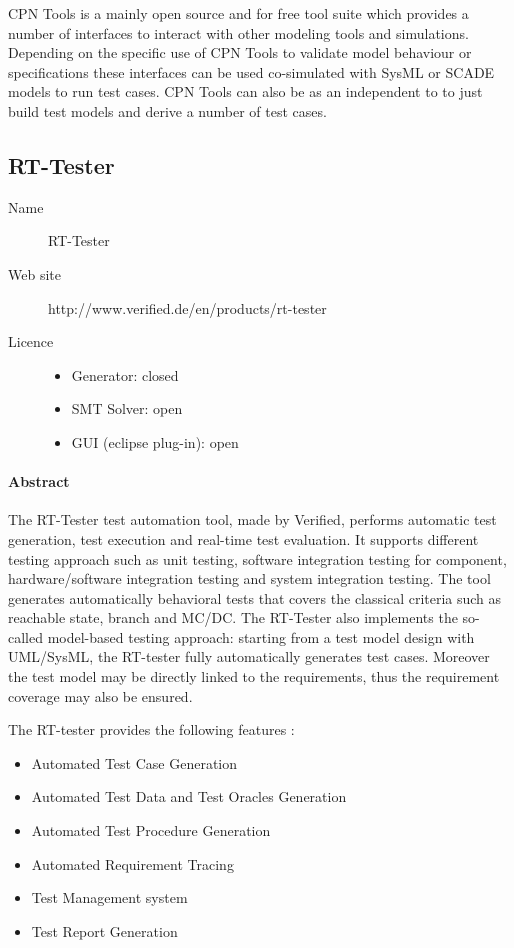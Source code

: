 CPN Tools is a mainly open source and for free tool suite which provides a number of interfaces to interact with other modeling tools and simulations. Depending on the specific use of CPN Tools to validate model behaviour or specifications these interfaces can be used co-simulated with SysML or SCADE models to run test cases. CPN Tools can also be as an independent to to just build test models and derive a number of test cases. 

\subsection{RT-Tester}
\label{sec:RT-Tester}

\begin{description}
\item[Name] RT-Tester
\item[Web site] http://www.verified.de/en/products/rt-tester
\item[Licence] 
  \begin{itemize}
    \item Generator:  closed
    \item SMT Solver: open
    \item GUI (eclipse plug-in): open
  \end{itemize}
\end{description}

\paragraph{Abstract}
The RT-Tester test automation tool, made by Verified, performs
automatic test generation, test execution and real-time test
evaluation.  It supports different testing approach such as unit
testing, software integration testing for component, hardware/software
integration testing and system integration testing.  
The tool generates automatically behavioral tests that covers the
classical criteria such as  reachable state, branch and MC/DC.
The RT-Tester also implements the so-called  model-based testing approach: 
starting from a test model design with UML/SysML, the RT-tester fully
automatically generates test cases. Moreover the test model may be
directly linked to the requirements, thus the requirement coverage may
also be ensured.

The RT-tester provides the following features :
\begin{itemize}
\item Automated Test Case Generation 
\item Automated Test Data and Test Oracles Generation 
\item Automated Test Procedure Generation 
\item Automated Requirement Tracing 
\item Test Management system 
\item Test Report Generation
\end{itemize}


